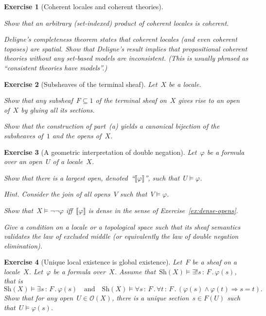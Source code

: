 \documentclass{ws-rv9x6}
\newtheorem{ex}{Exercise}
\newenvironment{exercise}[1]{
  \begin{ex}[#1]
}{\end{ex}}
\renewcommand{\O}{\mathcal{O}}
\newcommand{\Sh}{\mathrm{Sh}}
\renewcommand{\_}{\mathpunct{.}}
\newcommand{\?}{\,{:}\,}
\begin{document}
\begin{exercise}{Coherent locales and coherent theories}
\begin{alphlist}[(d)]
\item Show that an arbitrary (set-indexed) product of coherent locales is
coherent.

\item \emph{Deligne's completeness theorem} states that coherent locales (and
even coherent \emph{toposes}) are spatial. Show that Deligne's
result implies that propositional coherent theories
without any set-based models are inconsistent. (This is usually phrased as
``consistent theories have models''.)
\end{alphlist}
\end{exercise}

\begin{exercise}{Subsheaves of the terminal sheaf}%
\label{ex:subsheaves-1}%
Let~$X$ be a locale.
\begin{alphlist}[(b)]
\item Show that any subsheaf~$F \subseteq 1$ of the terminal sheaf on~$X$ gives rise
to an open of~$X$ by gluing all its sections.
\item Show that the construction of part~(a) yields a canonical bijection of
the subsheaves of~$1$ and the opens of~$X$.
\end{alphlist}
\end{exercise}

\begin{exercise}{A geometric interpretation of double negation}%
\label{ex:negneg-interpretation}%
Let~$\varphi$ be a formula over an open~$U$ of a locale~$X$.
\begin{alphlist}[(c)]
\item Show that there is a largest open,
denoted~``$\llbracket\varphi\rrbracket$'', such that~$U \models \varphi$.\smallskip

{\scriptsize\emph{Hint.} Consider the join of all opens~$V$ such that~$V
\models \varphi$.\par}

\item Show that~$X \models \neg\neg\varphi$ iff~$\llbracket\varphi\rrbracket$
is dense in the sense of Exercise~\ref{ex:dense-opens}.

\item Give a condition on a locale or a topological space such that its sheaf
semantics validates the law of excluded middle (or equivalently the law of
double negation elimination).
\end{alphlist}
\end{exercise}

\begin{exercise}{Unique local existence is global existence}%
\label{ex:global-existence}%
Let~$F$ be a sheaf on a locale~$X$. Let~$\varphi$ be a formula over~$X$. Assume
that~$\Sh(X) \models \exists!s\?F\_ \varphi(s)$, that is
\[ \Sh(X) \models \exists s\?F\_ \varphi(s) \quad\text{and}\quad
  \Sh(X) \models \forall s\?F\_ \forall t\?F\_ (\varphi(s) \wedge \varphi(t)
  \Rightarrow s = t). \]
Show that for any open~$U \in \O(X)$, there is a unique section~$s \in F(U)$
such that~$U \models \varphi(s)$.
\end{exercise}
\end{document}
